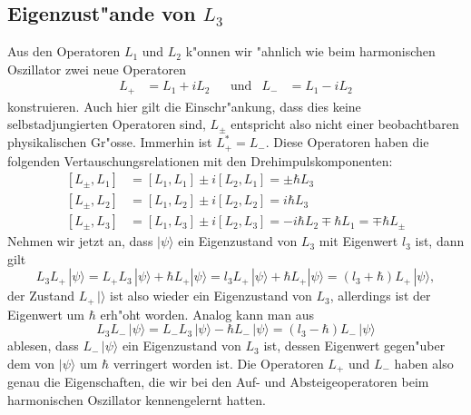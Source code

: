 \subsection{Eigenzust"ande von $L_3$}
%
%
Aus den Operatoren $L_1$ und $L_2$ k"onnen wir "ahnlich wie beim
harmonischen Oszillator zwei neue Operatoren
\begin{align*}
L_+&=L_1+iL_2
&
&\text{und}&
L_-&=L_1-iL_2
\end{align*}
konstruieren.
Auch hier gilt die Einschr"ankung, dass dies keine selbstadjungierten
Operatoren sind, $L_\pm$ entspricht also nicht einer beobachtbaren
physikalischen Gr"osse. 
Immerhin ist $L_+^*=L_-$.
Diese Operatoren haben die folgenden Vertauschungsrelationen mit
den Drehimpulskomponenten:
\begin{equation}
\begin{aligned} 
\phantom{ }	%
[L_\pm, L_1]
&=
[L_1,L_1]\pm i[L_2,L_1]
=
\pm \hbar L_3
\\
[L_\pm, L_2]
&=
[L_1,L_2]\pm i[L_2,L_2]
=
i\hbar L_3
\\
[L_\pm,L_3]
&=
[L_1,L_3]\pm i[L_2,L_3]
=
-i\hbar L_2
\mp
\hbar L_1
=
\mp \hbar L_\pm
\end{aligned}
\label{skript:lpmlkommutator}
\end{equation}
Nehmen wir jetzt an, dass $|\psi\rangle$ ein Eigenzustand von $L_3$ mit
Eigenwert $l_3$ ist, dann gilt
\[
L_3L_+\,|\psi\rangle
=
L_+L_3\,|\psi\rangle+\hbar L_+|\psi\rangle
=
l_3L_+\,|\psi\rangle+\hbar L_+|\psi\rangle
=
(l_3+\hbar)L_+\,|\psi\rangle,
\]
der Zustand $L_+\,|\rangle$ ist also wieder ein Eigenzustand von $L_3$,
allerdings ist der Eigenwert um $\hbar$ erh"oht worden.
Analog kann man aus
\[
L_3L_-\,|\psi\rangle
=
L_-L_3\,|\psi\rangle-\hbar L_-\,|\psi\rangle
=
(l_3-\hbar)L_-\,|\psi\rangle
\]
ablesen,  dass $L_-\,|\psi\rangle$ ein Eigenzustand von $L_3$ ist, dessen
Eigenwert gegen"uber dem von $|\psi\rangle$ um $\hbar$ verringert
worden ist.
Die Operatoren $L_+$ und $L_-$ haben also genau die Eigenschaften,
die wir bei den Auf- und Absteigeoperatoren beim harmonischen Oszillator
kennengelernt hatten.


